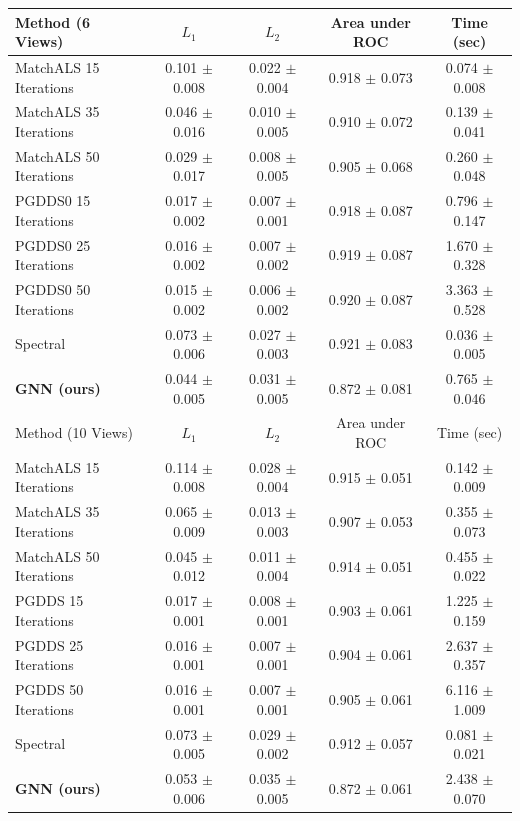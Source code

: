 \documentclass{article} %
\begin{document}
\begin{table}[t]
\begin{center}
\begin{tabular}{|l|c|c|c|c|}
\hline
Method (6 Views)                                     & $L_1$             & $L_2$             & Area under ROC    & Time (sec)        \\
\hline\hline
MatchALS 15 Iterations & 0.101 $\pm$ 0.008 & 0.022 $\pm$ 0.004 & 0.918 $\pm$ 0.073 & 0.074 $\pm$ 0.008 \\ \hline
MatchALS 35 Iterations & 0.046 $\pm$ 0.016 & 0.010 $\pm$ 0.005 & 0.910 $\pm$ 0.072 & 0.139 $\pm$ 0.041 \\ \hline
MatchALS 50 Iterations & 0.029 $\pm$ 0.017 & 0.008 $\pm$ 0.005 & 0.905 $\pm$ 0.068 & 0.260 $\pm$ 0.048 \\ \hline
PGDDS0 15 Iterations   & 0.017 $\pm$ 0.002 & 0.007 $\pm$ 0.001 & 0.918 $\pm$ 0.087 & 0.796 $\pm$ 0.147 \\ \hline
PGDDS0 25 Iterations   & 0.016 $\pm$ 0.002 & 0.007 $\pm$ 0.002 & 0.919 $\pm$ 0.087 & 1.670 $\pm$ 0.328 \\ \hline
PGDDS0 50 Iterations   & 0.015 $\pm$ 0.002 & 0.006 $\pm$ 0.002 & 0.920 $\pm$ 0.087 & 3.363 $\pm$ 0.528 \\ \hline
Spectral               & 0.073 $\pm$ 0.006 & 0.027 $\pm$ 0.003 & 0.921 $\pm$ 0.083 & 0.036 $\pm$ 0.005 \\ \hline
\textbf{GNN (ours)}    & 0.044 $\pm$ 0.005 & 0.031 $\pm$ 0.005 & 0.872 $\pm$ 0.081 & 0.765 $\pm$ 0.046 \\ \hline

\hline\hline
Method (10 Views)                                   & $L_1$             & $L_2$             & Area under ROC    & Time (sec)        \\
\hline\hline
MatchALS 15 Iterations & 0.114 $\pm$ 0.008 & 0.028 $\pm$ 0.004 & 0.915 $\pm$ 0.051 & 0.142 $\pm$ 0.009 \\ \hline
MatchALS 35 Iterations & 0.065 $\pm$ 0.009 & 0.013 $\pm$ 0.003 & 0.907 $\pm$ 0.053 & 0.355 $\pm$ 0.073 \\ \hline
MatchALS 50 Iterations & 0.045 $\pm$ 0.012 & 0.011 $\pm$ 0.004 & 0.914 $\pm$ 0.051 & 0.455 $\pm$ 0.022 \\ \hline
PGDDS 15 Iterations    & 0.017 $\pm$ 0.001 & 0.008 $\pm$ 0.001 & 0.903 $\pm$ 0.061 & 1.225 $\pm$ 0.159 \\ \hline
PGDDS 25 Iterations    & 0.016 $\pm$ 0.001 & 0.007 $\pm$ 0.001 & 0.904 $\pm$ 0.061 & 2.637 $\pm$ 0.357 \\ \hline
PGDDS 50 Iterations    & 0.016 $\pm$ 0.001 & 0.007 $\pm$ 0.001 & 0.905 $\pm$ 0.061 & 6.116 $\pm$ 1.009 \\ \hline
Spectral               & 0.073 $\pm$ 0.005 & 0.029 $\pm$ 0.002 & 0.912 $\pm$ 0.057 & 0.081 $\pm$ 0.021 \\ \hline
\textbf{GNN (ours)}    & 0.053 $\pm$ 0.006 & 0.035 $\pm$ 0.005 & 0.872 $\pm$ 0.061 & 2.438 $\pm$ 0.070 \\ \hline


\end{tabular}
\end{center}
\end{table}
\end{document}
